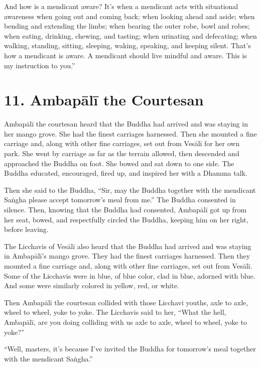 \documentclass[12pt,openany]{book}%
\begin{document}
And how is a mendicant aware? It’s when a mendicant acts with situational awareness when going out and coming back; when looking ahead and aside; when bending and extending the limbs; when bearing the outer robe, bowl and robes; when eating, drinking, chewing, and tasting; when urinating and defecating; when walking, standing, sitting, sleeping, waking, speaking, and keeping silent. That’s how a mendicant is aware. A mendicant should live mindful and aware. This is my instruction to you.” 

\section*{11. \textsanskrit{Ambapālī} the Courtesan }

\textsanskrit{Ambapālī} the courtesan heard that the Buddha had arrived and was staying in her mango grove. She had the finest carriages harnessed. Then she mounted a fine carriage and, along with other fine carriages, set out from \textsanskrit{Vesālī} for her own park. She went by carriage as far as the terrain allowed, then descended and approached the Buddha on foot. She bowed and sat down to one side. The Buddha educated, encouraged, fired up, and inspired her with a Dhamma talk. 

Then she said to the Buddha, “Sir, may the Buddha together with the mendicant \textsanskrit{Saṅgha} please accept tomorrow’s meal from me.” The Buddha consented in silence. Then, knowing that the Buddha had consented, \textsanskrit{Ambapālī} got up from her seat, bowed, and respectfully circled the Buddha, keeping him on her right, before leaving. 

The Licchavis of \textsanskrit{Vesālī} also heard that the Buddha had arrived and was staying in \textsanskrit{Ambapālī}’s mango grove. They had the finest carriages harnessed. Then they mounted a fine carriage and, along with other fine carriages, set out from \textsanskrit{Vesālī}. Some of the Licchavis were in blue, of blue color, clad in blue, adorned with blue. And some were similarly colored in yellow, red, or white. 

Then \textsanskrit{Ambapālī} the courtesan collided with those Licchavi youths, axle to axle, wheel to wheel, yoke to yoke. The Licchavis said to her, “What the hell, \textsanskrit{Ambapālī}, are you doing colliding with us axle to axle, wheel to wheel, yoke to yoke?” 

“Well, masters, it’s because I’ve invited the Buddha for tomorrow’s meal together with the mendicant \textsanskrit{Saṅgha}.” 
\end{document}

